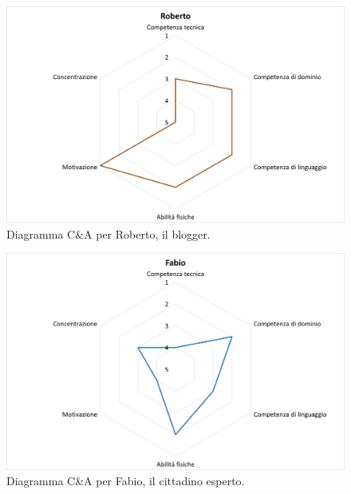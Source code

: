 \begin{figure}[H]
    \centering
    \includegraphics[width=0.5\columnwidth]{assets/images/proposta-design/caos/roberto}
    \caption{Diagramma C\&A per Roberto, il blogger.}
\end{figure}

\begin{figure}[H]
    \centering
    \includegraphics[width=0.5\columnwidth]{assets/images/proposta-design/caos/fabio}
    \caption{Diagramma C\&A per Fabio, il cittadino esperto.}
\end{figure}

